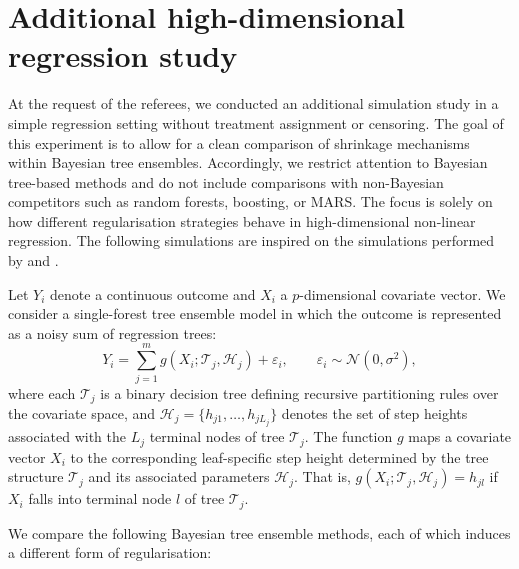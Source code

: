 \section{Additional high-dimensional regression study}

At the request of the referees, we conducted an additional simulation study in a simple regression setting without treatment assignment or censoring. 
The goal of this experiment is to allow for a clean comparison of shrinkage mechanisms within Bayesian tree ensembles. 
Accordingly, we restrict attention to Bayesian tree-based methods and do not include comparisons with non-Bayesian competitors such as random forests, boosting, or MARS. 
The focus is solely on how different regularisation strategies behave in high-dimensional non-linear regression.
The following simulations are inspired on the simulations performed by \citet{linero2018dirichlet} and \citet{LineroYang2018}.

Let $Y_i$ denote a continuous outcome and $X_i$ a $p$-dimensional covariate vector. 
We consider a single-forest tree ensemble model in which the outcome is represented as a noisy sum of regression trees:
\begin{equation}\label{bart_model}
Y_i = \sum_{j=1}^m g(X_i; \mathcal{T}_j, \mathcal{H}_j) + \varepsilon_i, 
\qquad 
\varepsilon_i \sim \mathcal{N}(0, \sigma^2),
\end{equation}
where each $\mathcal{T}_j$ is a binary decision tree defining recursive partitioning rules over the covariate space, and 
$\mathcal{H}_j = \{h_{j1}, \ldots, h_{jL_j}\}$ denotes the set of step heights associated with the $L_j$ terminal nodes of tree $\mathcal{T}_j$.
The function $g$ maps a covariate vector $X_i$ to the corresponding leaf-specific step height determined by the tree structure $\mathcal{T}_j$ and its associated parameters $\mathcal{H}_j$. 
That is, $g(X_i; \mathcal{T}_j, \mathcal{H}_j) = h_{jl}$ if $X_i$ falls into terminal node $l$ of tree $\mathcal{T}_j$.

We compare the following Bayesian tree ensemble methods, each of which induces a different form of regularisation:



